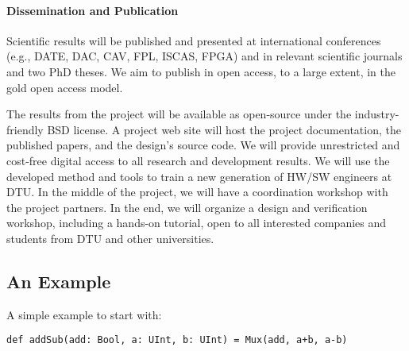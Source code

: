 \documentclass[fleqn,12pt]{article}
\begin{document}


\paragraph*{Dissemination and Publication}

Scientific results will be published and presented at international
conferences (e.g., DATE, DAC, CAV, FPL, ISCAS, FPGA) and in relevant scientific journals
and two PhD theses.
We aim to publish in open access, to a large extent, in the gold open access model.

The results from the project will be available as open-source under the
industry-friendly BSD license.
A project web site will host the project documentation, the published papers, and the design's source code.
We will provide unrestricted and cost-free digital access to all research and development results.
%
We will use the developed method and tools to train a new generation of HW/SW engineers
at DTU.
In the middle of the project, we will have a coordination workshop with the project partners.
In the end, we will organize a design and verification workshop, including a hands-on tutorial,
open to all interested companies and students from DTU and other universities.

\subsection{An Example}

A simple example to start with:

\begin{verbatim}
def addSub(add: Bool, a: UInt, b: UInt) = Mux(add, a+b, a-b)
\end{verbatim}
\end{document}
